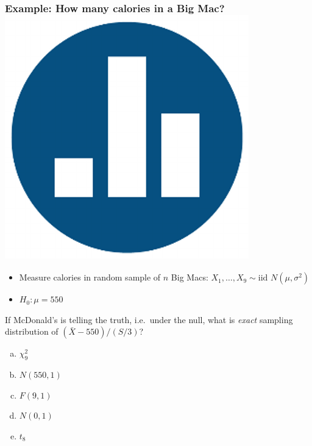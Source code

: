 \documentclass[handout]{beamer}
\begin{document}
%
%
\begin{frame}[t]
	\frametitle{Example: How many calories in a Big Mac? \hfill \includegraphics[scale = 0.05]{./images/clicker}}
\begin{itemize}
	\item Measure calories in random sample of $n$ Big Macs: $X_1, \hdots, X_9 \sim \mbox{iid } N (\mu, \sigma^2)$
	\item $H_0\colon \mu = 550$
\end{itemize}

\vspace{1em}

\alert{If McDonald's is telling the truth, i.e.\ under the null, what is \emph{exact}  sampling distribution of $(\bar{X} - 550)/(S/3)$?}
\begin{enumerate}[(a)]
	\item $\chi^2_{9}$
	\item $N(550, 1)$
	\item $F(9, 1)$
	\item $N(0,1)$ 
	\item $t_{8}$
\end{enumerate}
\end{frame}
\end{document}
